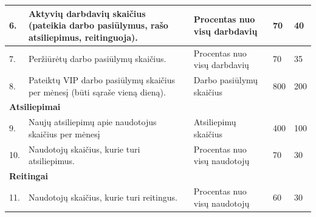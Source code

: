 \documentclass{VUMIFPSkursinis}
\begin{document}
\begin{table}[H]
\begin{tabular}{|p{0.6cm}|p{6cm}|p{3cm}|p{1.6cm}|p{1.5cm}|}
\multicolumn{1}{|m{0.6cm}|}{6.}&\multicolumn{1}{m{6cm}|}{Aktyvių darbdavių skaičius (pateikia darbo pasiūlymus, rašo atsiliepimus, reitinguoja).}&\multicolumn{1}{m{3cm}|}{Procentas nuo visų darbdavių}&\multicolumn{1}{m{1.6cm}|}{70}&\multicolumn{1}{m{1.5cm}|}{40}\\ \hline

\multicolumn{1}{|m{0.6cm}|}{7.}&\multicolumn{1}{m{6cm}|}{Peržiūrėtų darbo pasiūlymų skaičius.}&\multicolumn{1}{m{3cm}|}{Procentas nuo visų darbdavių}&\multicolumn{1}{m{1.6cm}|}{70}&\multicolumn{1}{m{1.5cm}|}{35}\\ \hline

\multicolumn{1}{|m{0.6cm}|}{8.}&\multicolumn{1}{m{6cm}|}{Pateiktų VIP darbo pasiūlymų skaičius per mėnesį (būti sąraše vieną dieną).}&\multicolumn{1}{m{3cm}|}{Darbo pasiūlymų skaičius}&\multicolumn{1}{m{1.6cm}|}{800}&\multicolumn{1}{m{1.5cm}|}{200}\\ \hline

\multicolumn{5}{|l|}{\textbf{Atsiliepimai}} \\ \hline

\multicolumn{1}{|m{0.6cm}|}{9.}&\multicolumn{1}{m{6cm}|}{Naujų atsiliepimų apie naudotojus skaičius per mėnesį}&\multicolumn{1}{m{3cm}|}{Atsiliepimų skaičius}&\multicolumn{1}{m{1.6cm}|}{400}&\multicolumn{1}{m{1.5cm}|}{100}\\ \hline

\multicolumn{1}{|m{0.6cm}|}{10.}&\multicolumn{1}{m{6cm}|}{Naudotojų skaičius, kurie turi atsiliepimus.}&\multicolumn{1}{m{3cm}|}{Procentas nuo visų naudotojų}&\multicolumn{1}{m{1.6cm}|}{70}&\multicolumn{1}{m{1.5cm}|}{30}\\ \hline

\multicolumn{5}{|l|}{\textbf{Reitingai}} \\ \hline

\multicolumn{1}{|m{0.6cm}|}{11.}&\multicolumn{1}{m{6cm}|}{Naudotojų skaičius, kurie turi reitingus.}&\multicolumn{1}{m{3cm}|}{Procentas nuo visų naudotojų}&\multicolumn{1}{m{1.6cm}|}{60}&\multicolumn{1}{m{1.5cm}|}{30}\\ \hline

\end{tabular}
\end{table}
\end{document}
